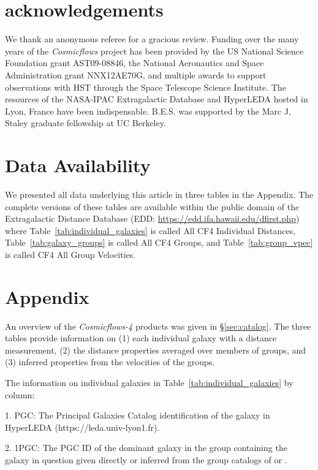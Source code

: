 \documentclass[twocolumn]{aastex63}
\begin{document}
\section{acknowledgements}

We thank an anonymous referee for a gracious review.
Funding over the many years of the {\it Cosmicflows} project has been provided by the US National Science Foundation grant AST09-08846, the National Aeronautics and Space Administration grant NNX12AE70G, and multiple awards to support observations with HST through the Space Telescope Science Institute.  The resources of the NASA-IPAC Extragalactic Database and HyperLEDA hosted in Lyon, France have been indispensable. 
B.E.S. was supported by the Marc J, Staley graduate fellowship at UC Berkeley.

\section*{Data Availability}

We presented all data underlying this article in three tables in the Appendix. The complete versions of these tables are available within the public domain of the Extragalactic Distance Database (EDD: \url{https://edd.ifa.hawaii.edu/dfirst.php}) where Table~\ref{tab:individual_galaxies} is called All CF4 Individual Distances, Table~\ref{tab:galaxy_groups} is called All CF4 Groups, and Table~\ref{tab:group_vpec} is called CF4 All Group Velocities.



\section{Appendix}
\label{sec:appendix}

An overview of the {\it Cosmicflows-4} products was given in \S \ref{sec:catalog}.  The three tables provide information on (1) each individual galaxy with a distance measurement, (2) the distance properties averaged over members of groups, and (3) inferred properties from the velocities of the groups.

\bigskip
The information on individual galaxies in Table~\ref{tab:individual_galaxies} by column:

1. PGC: The Principal Galaxies Catalog identification of the galaxy in HyperLEDA (https://leda.univ-lyon1.fr).

2. 1PGC: The PGC ID of the dominant galaxy in the group containing the galaxy in question given directly or inferred from the group catalogs of \citet{2017ApJ...843...16K} or \citet{2015AJ....149..171T}.
\end{document}

